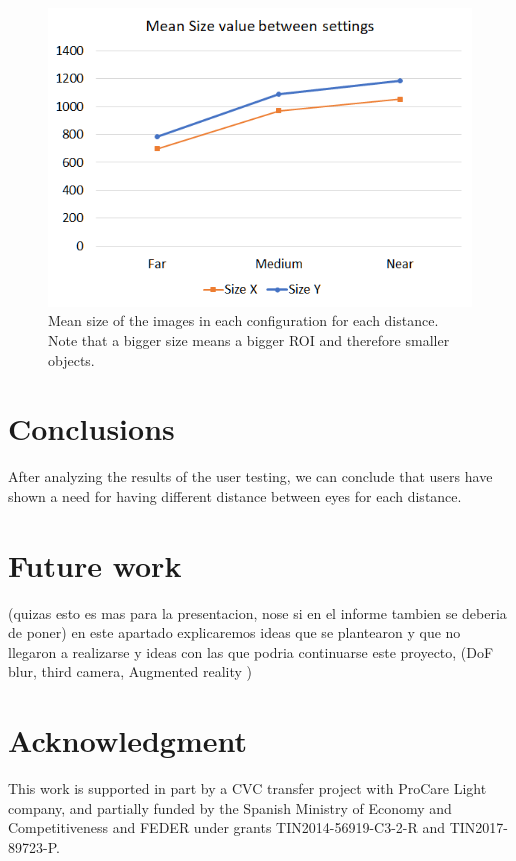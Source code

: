 \documentclass[10pt,a4paper,twocolumn,twoside]{article}
\begin{document}
	\begin{figure}
		\centering
		\includegraphics[width=1\linewidth]{img/userTestingSizechart.png}
		\caption{Mean size of the images in each configuration for each distance. Note that a bigger size means a bigger ROI and therefore smaller objects.}
		\label{fig:ut:2:size}
	\end{figure}


	
	\section{Conclusions}
	After analyzing the results of the user testing, we can conclude that users have shown a need for having different distance between eyes for each distance. 
	
	
	
	
	\section{Future work}
	(quizas esto es mas para la presentacion, nose si en el informe tambien se deberia de poner)
	en este apartado explicaremos ideas que se plantearon y que no llegaron a realizarse y ideas con las que podria continuarse este proyecto, (DoF blur, third camera, Augmented reality )
	
	\section*{Acknowledgment}
	This work is supported in part by a CVC transfer project with ProCare Light company, and partially funded by the Spanish Ministry of Economy and Competitiveness and FEDER under grants TIN2014-56919-C3-2-R and TIN2017-89723-P.
	
\end{document}
